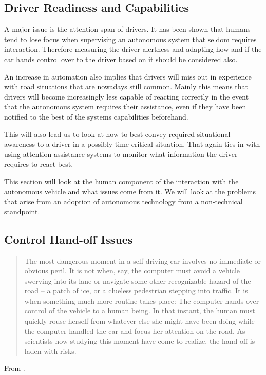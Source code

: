 \documentclass{acm_proc_article-sp}
\begin{document}
\subsection{Driver Readiness and Capabilities}

A major issue is the attention span of drivers.
It has been shown that humans tend to lose focus when supervising an autonomous system that seldom requires interaction.
Therefore measuring the driver alertness and adapting how and if the car hands control over to the driver based on it should be considered also.

An increase in automation also implies that drivers will miss out in experience with road situations that are nowadays still common.
Mainly this means that drivers will become increasingly less capable of reacting correctly in the event that the autonomous system requires their assistance, even if they have been notified to the best of the systems capabilities beforehand.

This will also lead us to look at how to best convey required situational awareness to a driver in a possibly time-critical situation.
That again ties in with using attention assistance systems to monitor what information the driver requires to react best.

This section will look at the human component of the interaction with the autonomous vehicle and what issues come from it.
We will look at the problems that arise from an adoption of autonomous technology from a non-technical standpoint.

\subsection{Control Hand-off Issues}
\label{hand_off_issue}

\begin{quote}
The most dangerous moment in a self-driving car involves no immediate or obvious peril.
It is not when, say, the computer must avoid a vehicle swerving into its lane or navigate some other recognizable hazard of the road -- a patch of ice, or a clueless pedestrian stepping into traffic.
It is when something much more routine takes place: The computer hands over control of the vehicle to a human being.
In that instant, the human must quickly rouse herself from whatever else she might have been doing while the computer handled the car and focus her attention on the road.
As scientists now studying this moment have come to realize, the hand-off is laden with risks.
\end{quote}
From \cite{www:huffington_post}.
\end{document}
